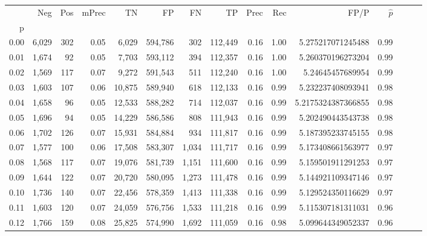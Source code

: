 \begin{tabular}{rrrrrrrrrrrrrrr}
\toprule
{} &     Neg &    Pos & mPrec &       TN &       FP &       FN &       TP &  Prec &   Rec &                  FP/P & $\hat{p}$ \\
p    &         &        &       &          &          &          &          &       &       &                       &           \\
\midrule
0.00 &   6,029 &    302 &  0.05 &    6,029 &  594,786 &      302 &  112,449 &  0.16 &  1.00 &     5.275217071245488 &      0.99 \\
0.01 &   1,674 &     92 &  0.05 &    7,703 &  593,112 &      394 &  112,357 &  0.16 &  1.00 &     5.260370196273204 &      0.99 \\
0.02 &   1,569 &    117 &  0.07 &    9,272 &  591,543 &      511 &  112,240 &  0.16 &  1.00 &      5.24645457689954 &      0.99 \\
0.03 &   1,603 &    107 &  0.06 &   10,875 &  589,940 &      618 &  112,133 &  0.16 &  0.99 &     5.232237408093941 &      0.98 \\
0.04 &   1,658 &     96 &  0.05 &   12,533 &  588,282 &      714 &  112,037 &  0.16 &  0.99 &    5.2175324387366855 &      0.98 \\
0.05 &   1,696 &     94 &  0.05 &   14,229 &  586,586 &      808 &  111,943 &  0.16 &  0.99 &     5.202490443543738 &      0.98 \\
0.06 &   1,702 &    126 &  0.07 &   15,931 &  584,884 &      934 &  111,817 &  0.16 &  0.99 &     5.187395233745155 &      0.98 \\
0.07 &   1,577 &    100 &  0.06 &   17,508 &  583,307 &    1,034 &  111,717 &  0.16 &  0.99 &     5.173408661563977 &      0.97 \\
0.08 &   1,568 &    117 &  0.07 &   19,076 &  581,739 &    1,151 &  111,600 &  0.16 &  0.99 &     5.159501911291253 &      0.97 \\
0.09 &   1,644 &    122 &  0.07 &   20,720 &  580,095 &    1,273 &  111,478 &  0.16 &  0.99 &     5.144921109347146 &      0.97 \\
0.10 &   1,736 &    140 &  0.07 &   22,456 &  578,359 &    1,413 &  111,338 &  0.16 &  0.99 &     5.129524350116629 &      0.97 \\
0.11 &   1,603 &    120 &  0.07 &   24,059 &  576,756 &    1,533 &  111,218 &  0.16 &  0.99 &     5.115307181311031 &      0.96 \\
0.12 &   1,766 &    159 &  0.08 &   25,825 &  574,990 &    1,692 &  111,059 &  0.16 &  0.98 &     5.099644349052337 &      0.96 \\

\end{tabular}
